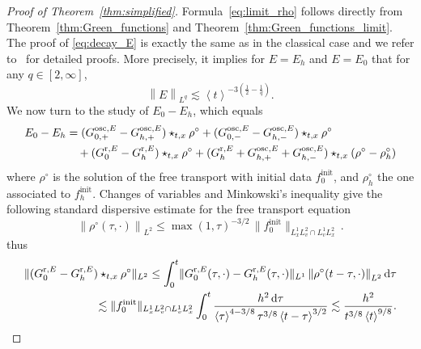 \documentclass[a4paper,12pt]{amsart} %
\theoremstyle{plain}
\theoremstyle{definition}
\newcommand		{\lt}			{\left}				%
\newcommand		{\rt}			{\right}			%
\renewcommand	{\(}			{\lt(}
\renewcommand	{\)}			{\rt)}
\newcommand		{\bangle}[1]	{\lt\langle #1\rt\rangle}
\newcommand		{\weight}[1]	{\bangle{#1}}	%
\newcommand		{\nrm}[1]		{\lt\lVert{#1}\rt\rVert}		%
\newcommand		{\snrm}[1]		{\lVert #1\rVert}
\newcommand		{\Nrm}[2]		{\nrm{#1}_{#2}}
\newcommand		{\sNrm}[2]		{\snrm{#1}_{#2}}
\renewcommand		{\d}		{\mathop{}\!\mathrm{d}}		%
\newcommand		{\init}			{\mathrm{init}}
\newcommand	{\h}			{h}
\newcommand		{\GrE}			{G^{\textnormal{r},E}}
\newcommand		{\GoscE}		{G^{\textnormal{osc},E}}
\begin{document}
	\begin{proof}[Proof of Theorem~\ref{thm:simplified}]
		Formula~\eqref{eq:limit_rho} follows directly from Theorem~\ref{thm:Green_functions} and Theorem~\ref{thm:Green_functions_limit}. The proof of \eqref{eq:decay_E} is exactly the same as in the classical case and we refer to~\cite{bedrossian_linearized_2022} for detailed proofs. More precisely, it implies for $E= E_\h$ and $E=E_0$ that for any $q\in[2,\infty]$,
		\begin{equation*}
			\Nrm{E}{L^q} \lesssim \weight{t}^{-3\lt(\frac{1}{2}-\frac{1}{q}\rt)} .
		\end{equation*}
		We now turn to the study of $E_0 - E_h$, which equals
		\begin{align*}
			E_0 - E_h &= (\GoscE_{0,+} - \GoscE_{h,+}) \star_{t,x} \rho^\circ + (\GoscE_{0,-} - \GoscE_{h,-}) \star_{t,x} \rho^\circ
			\\
			&\quad + (\GrE_0 - \GrE_h) \star_{t,x} \rho^\circ + (\GrE_h + \GoscE_{h,+} +\GoscE_{h,-}) \star_{t,x} (\rho^\circ - \rho^\circ_h)
		\end{align*}
		where $\rho^\circ$ is the solution of the free transport with initial data $f_0^\init$, and $\rho^\circ_h$ the one associated to $f_h^\init$. Changes of variables and Minkowski's inequality give the following standard dispersive estimate for the free transport equation
		\begin{equation*}
			\Nrm{\rho^\circ(\tau,\cdot)}{L^2} \leq \max(1,\tau)^{-3/2}\, \sNrm{f_0^\init}{L^1_xL^2_v\cap L^1_vL^2_x} \, .
		\end{equation*}
		thus
		\begin{align*}
			\sNrm{(\GrE_0 - \GrE_h) \star_{t,x} \rho^\circ}{L^2} 
			\leq \int_0^t \sNrm{\GrE_0(\tau,\cdot) - \GrE_h(\tau,\cdot)}{L^1} 
			\Nrm{\rho^\circ(t - \tau,\cdot)}{L^2} \d\tau
			\\
			\lesssim \sNrm{f_0^\init}{L^1_xL^2_v\cap L^1_vL^2_x} \int_0^t \frac{h^2 \d \tau}{\weight{\tau}^{4-3/8} \tau^{3/8} \weight{t - \tau}^{3/2}}  \lesssim \frac{h^2}{t^{3/8}\weight{t}^{9/8}} .
		\end{align*}
        

\end{proof}
\end{document}
